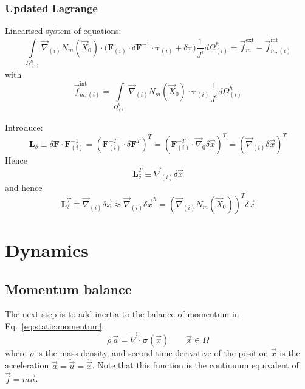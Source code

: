 \documentclass[times,namecite]{goose-article}
\begin{document}
\subsubsection{Updated Lagrange}

Linearised system of equations:
\begin{equation}
  \int\limits_{\Omega_{(i)}^h} \vec{\nabla}_{(i)} N_m(\vec{X}_0) \cdot \big(
    \bm{F}_{(i)} \cdot \delta \bm{F}^{-1} \cdot \bm{\tau}_{(i)} + \delta \bm{\tau}
  \big) \frac{1}{J^i} d \Omega_{(i)}^h
  =
  \vec{f}_{m}^\mathrm{ext} - \vec{f}_{m,(i)}^\mathrm{int}
\end{equation}
with
\begin{equation}
  \vec{f}_{m,(i)}^\mathrm{int} = \int\limits_{\Omega_{(i)}^h} \vec{\nabla}_{(i)} N_m(\vec{X}_0) \cdot \bm{\tau}_{(i)} \frac{1}{J^i} d \Omega_{(i)}^h
\end{equation}

Introduce:
\begin{equation}
  \bm{L}_\delta
  \equiv \delta \bm{F} \cdot \bm{F}_{(i)}^{-1}
  = \left( \bm{F}_{(i)}^{-T} \cdot \delta \bm{F}^T \right)^T
  = \left( \bm{F}_{(i)}^{-T} \cdot \vec{\nabla}_0 \delta \vec{x} \right)^T
  = \left( \vec{\nabla}_{(i)} \delta \vec{x} \right)^T
\end{equation}
Hence
\begin{equation}
  \bm{L}_\delta^T \equiv \vec{\nabla}_{(i)} \delta \vec{x}
\end{equation}
and hence
\begin{equation}
  \bm{L}_\delta^T
  \equiv \vec{\nabla}_{(i)} \delta \vec{x}
  \approx \vec{\nabla}_{(i)} \delta \vec{x}^h
  = \left( \vec{\nabla}_{(i)} N_m(\vec{X}_0) \right)^T \delta \vec{x}
\end{equation}

\section{Dynamics}

\subsection{Momentum balance}

The next step is to add inertia to the balance of momentum in Eq.~\eqref{eq:static:momentum}:
\begin{equation}
  \rho\, \vec{a}
  =
  \vec{\nabla} \cdot
  \bm{\sigma}(\vec{x})
  \qquad
  \vec{x} \in \Omega
\end{equation}
where $\rho$ is the mass density, and second time derivative of the position $\vec{x}$ is the acceleration $\vec{a} = \ddot{\vec{u}} = \ddot{\vec{x}}$. Note that this function is the continuum equivalent of $\vec{f} = m \vec{a}$.
\end{document}
